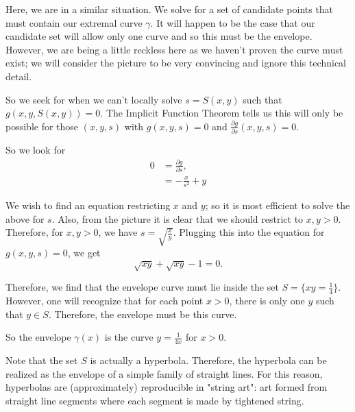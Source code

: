 Here, we are in a similar situation. We solve for a set of candidate points that must contain our extremal curve \(\gamma\). 
It will happen to be the case that our candidate set will allow only one curve and so this must be the envelope.
However, we are being a little reckless here as we haven't proven the curve must exist; we will consider the picture to be very convincing and ignore this technical detail. 

So we seek for when we can't locally solve \(s = S(x,y)\) such that \(g(x, y, S(x, y)) = 0\). The Implicit Function Theorem tells us this will only be possible for those \((x,y,s)\) with \(g(x,y,s) = 0\) and \(\frac{\partial g}{\partial s} (x, y, s) = 0\).

So we look for
\begin{align}
0 & = \frac{\partial g}{\partial s}, \\
&  = -\frac{x}{s^2} + y
\end{align}

We wish to find an equation restricting \(x\) and \(y\); so it is most efficient to solve the above for \(s\). 
Also, from the picture it is clear that we should restrict to \(x, y > 0\). 
Therefore, for \(x, y > 0\), we have \(s = \sqrt{\frac{x}{y}}\). Plugging this into the equation for \(g(x, y, s) = 0\), we get 
\begin{equation}
\sqrt{xy} + \sqrt{xy} - 1 = 0.
\end{equation} 

Therefore, we find that the envelope curve must lie inside the set \(S = \{xy = \frac{1}{4}\}\). However, one will recognize that for each point \(x > 0\), there is only one \(y\) such that \(y \in S\). Therefore, the envelope must be this curve.

So the envelope \(\gamma(x)\) is the curve \(y = \frac{1}{4x}\) for \(x > 0\).  

Note that the set \(S\) is actually a hyperbola. Therefore, the hyperbola can be realized as the envelope of a simple family of straight lines. For this reason, hyperbolas are (approximately) reproducible in "string art": art formed from
straight line segments where each segment is made by tightened string.
